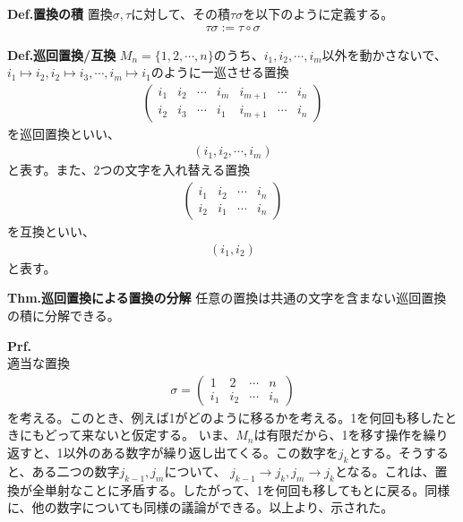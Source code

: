 \documentclass[a4paper,11pt]{jsarticle}
\numberwithin{equation}{section}
\begin{document}
\begin{itembox}[l]{\textbf{Def.置換の積}}
  置換$\sigma,\tau$に対して、その積$\tau \sigma$を以下のように定義する。
  \begin{align}
    \tau \sigma := \tau \circ \sigma
  \end{align}
\end{itembox}

\begin{itembox}[l]{\textbf{Def.巡回置換/互換}}
  $M_n = \{1,2,\cdots,n\}$のうち、$i_1,i_2,\cdots,i_m$以外を動かさないで、$i_1 \mapsto i_2, i_2 \mapsto i_3, \cdots, i_m \mapsto i_1$のように一巡させる置換
  \begin{align}
    \begin{pmatrix}
      i_1 & i_2 & \cdots & i_m & i_{m+1} & \cdots & i_n\\
      i_2 & i_3 & \cdots & i_1 & i_{m+1} & \cdots & i_n
    \end{pmatrix}
  \end{align}
  を巡回置換といい、
  \begin{align}
    (i_1,i_2,\cdots,i_m)
  \end{align}
  と表す。また、$2$つの文字を入れ替える置換
  \begin{align}
    \begin{pmatrix}
      i_1 & i_2 & \cdots & i_n\\
      i_2 & i_1 & \cdots & i_n
    \end{pmatrix}
  \end{align}
  を互換といい、
  \begin{align}
    (i_1,i_2)
  \end{align}
  と表す。
\end{itembox}

\begin{itembox}[l]{\textbf{Thm.巡回置換による置換の分解}}
  任意の置換は共通の文字を含まない巡回置換の積に分解できる。
\end{itembox}
\textbf{Prf.}\\
適当な置換
\begin{align}
  \sigma = \begin{pmatrix}
    1 & 2 & \cdots & n\\
    i_1 & i_2 & \cdots & i_n
  \end{pmatrix}
\end{align}
を考える。このとき、例えば1がどのように移るかを考える。1を何回も移したときにもどって来ないと仮定する。
いま、$M_n$は有限だから、1を移す操作を繰り返すと、1以外のある数字が繰り返し出てくる。この数字を$j_k$とする。そうすると、ある二つの数字$j_{k-1},j_m$について、
$j_{k-1} \to j_k, j_m \to j_{k}$となる。これは、置換が全単射なことに矛盾する。したがって、1を何回も移してもとに戻る。同様に、他の数字についても同様の議論ができる。以上より、示された。\hfill\qedsymbol\\
\end{document}

